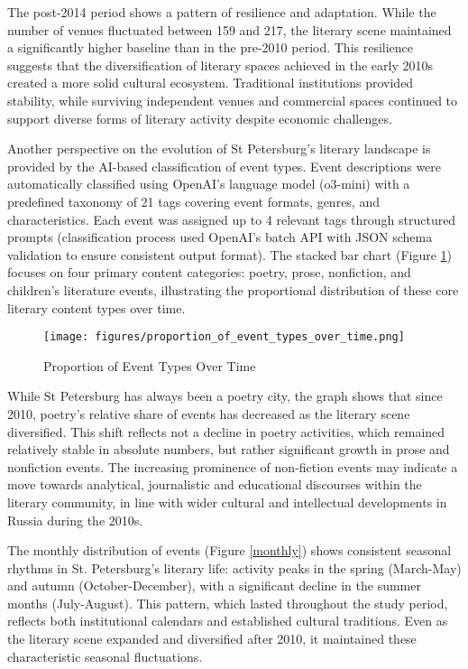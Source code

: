 \documentclass{jcls}
\begin{document}
The post-2014 period shows a pattern of resilience and adaptation. While the number of venues fluctuated between 159 and 217, the literary scene maintained a significantly higher baseline than in the pre-2010 period. This resilience suggests that the diversification of literary spaces achieved in the early 2010s created a more solid cultural ecosystem. Traditional institutions provided stability, while surviving independent venues and commercial spaces continued to support diverse forms of literary activity despite economic challenges.

Another perspective on the evolution of St Petersburg's literary landscape is provided by the AI-based classification of event types. Event descriptions were automatically classified using OpenAI's language model (o3-mini) with a predefined taxonomy of 21 tags covering event formats, genres, and characteristics. Each event was assigned up to 4 relevant tags through structured prompts (classification process used OpenAI's batch API with JSON schema validation to ensure consistent output format). The stacked bar chart (Figure \ref{eventtypes}) focuses on four primary content categories: poetry, prose, nonfiction, and children's literature events, illustrating the proportional distribution of these core literary content types over time.

\begin{figure}
	\texttt{[image: figures/proportion\_of\_event\_types\_over\_time.png]}
	\caption{Proportion of Event Types Over Time}
    \label{eventtypes}
\end{figure}

While St Petersburg has always been a poetry city, the graph shows that since 2010, poetry's relative share of events has decreased as the literary scene diversified. This shift reflects not a decline in poetry activities, which remained relatively stable in absolute numbers, but rather significant growth in prose and nonfiction events. The increasing prominence of non-fiction events may indicate a move towards analytical, journalistic and educational discourses within the literary community, in line with wider cultural and intellectual developments in Russia during the 2010s.

The monthly distribution of events (Figure \ref{monthly}) shows consistent seasonal rhythms in St. Petersburg's literary life: activity peaks in the spring (March-May) and autumn (October-December), with a significant decline in the summer months (July-August). This pattern, which lasted throughout the study period, reflects both institutional calendars and established cultural traditions. Even as the literary scene expanded and diversified after 2010, it maintained these characteristic seasonal fluctuations.
\end{document}

